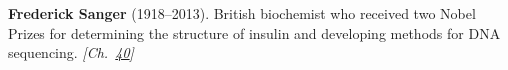 \nobelchemistry\nobelchemistry \textbf{Frederick Sanger} (1918–2013). British biochemist who received two Nobel Prizes for determining the structure of insulin and developing methods for DNA sequencing. \emph{[Ch.~\hyperref[ch:dnasequencing]{40}]}

